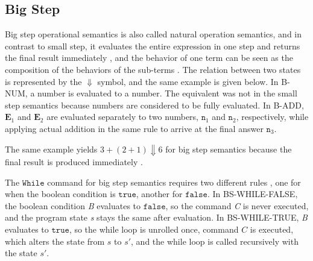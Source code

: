 \documentclass[a4paper,11pt,twoside]{report}
\begin{document}
\begin{mathpar}
\end{mathpar}

\subsection{Big Step}
Big step operational semantics is also called natural operation semantics, and in contrast to small step, it evaluates the entire expression in one step and returns the final result immediately \cite{Lecture2}, and the behavior of one term can be seen as the composition of the behaviors of the sub-terms \cite{chargueraud-13-pretty}. The relation between two states is represented by the $\Downarrow$ symbol, and the same example is given below. In B-NUM, a number is evaluated to a number. The equivalent was not in the small step semantics because numbers are considered to be fully evaluated. In B-ADD, $\mathbf{E}_1$ and $\mathbf{E}_2$ are evaluated separately to two numbers, $\texttt{n}_1$ and $\texttt{n}_2$, respectively, while applying actual addition in the same rule to arrive at the final answer $\texttt{n}_3$.


The same example yields $3 + ( 2 + 1 ) \Downarrow 6 $ for big step semantics because the final result is produced immediately \cite{Lecture2}. 

 The $\mathtt{While}$ command for big step semantics requires two different rules \cite{LectureBS}, one for when the boolean condition is $\mathtt{true}$, another for $\mathtt{false}$. In BS-WHILE-FALSE, the boolean condition \textit{B} evaluates to $\mathtt{false}$, so the command \textit{C} is never executed, and the program state \textit{s} stays the same after evaluation. In BS-WHILE-TRUE, \textit{B} evaluates to $\mathtt{true}$, so the while loop is unrolled once, command $C$ is executed, which alters the state from $s$ to $s'$, and the while loop is called recursively with the state $s'$.
\end{document}
